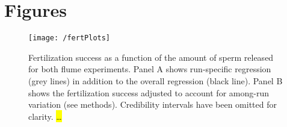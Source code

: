 \documentclass{article}
\begin{document}




\section*{Figures}
 
\begin{figure}[!ht] 
\texttt{[image: /fertPlots]}
\caption{Fertilization success as a function of the amount of sperm released for both flume experiments. Panel A shows run-specific regression (grey lines) in addition to the overall regression (black line). Panel B shows the fertilization success adjusted to account for among-run variation (see methods). Credibility intervals have been omitted for clarity. \hl{\ldots}}
\label{fig:fertPlots}
\end{figure}
\newpage{}
\end{document}
